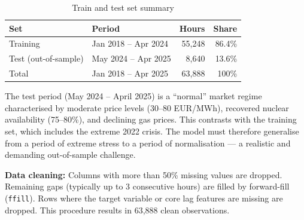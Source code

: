 \begin{table}[H]
  \centering
  \caption{Train and test set summary}
  \label{tab:split}
  \begin{tabular}{llrr}
    \toprule
    \textbf{Set} & \textbf{Period} & \textbf{Hours} & \textbf{Share} \\
    \midrule
    Training & Jan 2018 -- Apr 2024 & 55,248 & 86.4\% \\
    Test (out-of-sample) & May 2024 -- Apr 2025 & 8,640 & 13.6\% \\
    \midrule
    Total & Jan 2018 -- Apr 2025 & 63,888 & 100\% \\
    \bottomrule
  \end{tabular}
\end{table}

The test period (May 2024 -- April 2025) is a ``normal'' market regime characterised by moderate price levels (30--80 EUR/MWh), recovered nuclear availability (75--80\%), and declining gas prices. This contrasts with the training set, which includes the extreme 2022 crisis. The model must therefore generalise from a period of extreme stress to a period of normalisation — a realistic and demanding out-of-sample challenge.

\textbf{Data cleaning:} Columns with more than 50\% missing values are dropped. Remaining gaps (typically up to 3 consecutive hours) are filled by forward-fill (\texttt{ffill}). Rows where the target variable or core lag features are missing are dropped. This procedure results in 63,888 clean observations.
